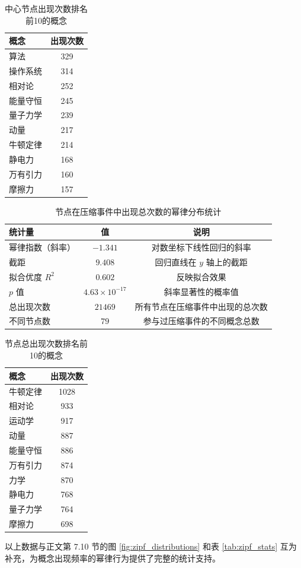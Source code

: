 \documentclass[12pt,a4paper]{article}
\begin{document}
\begin{table}[H]
\centering
\caption{中心节点出现次数排名前10的概念}
\label{tab:app_zipf_center_top10}
\begin{tabular}{lc}
\toprule
\textbf{概念} & \textbf{出现次数} \\
\midrule
算法      & 329 \\
操作系统  & 314 \\
相对论    & 252 \\
能量守恒  & 245 \\
量子力学  & 239 \\
动量      & 217 \\
牛顿定律  & 214 \\
静电力    & 168 \\
万有引力  & 160 \\
摩擦力    & 157 \\
\bottomrule
\end{tabular}
\end{table}

\begin{table}[H]
\centering
\caption{节点在压缩事件中出现总次数的幂律分布统计}
\label{tab:app_zipf_total}
\begin{tabular}{lcc}
\toprule
\textbf{统计量} & \textbf{值} & \textbf{说明} \\
\midrule
幂律指数（斜率） & $-1.341$ & 对数坐标下线性回归的斜率 \\
截距 & $9.408$ & 回归直线在 $y$ 轴上的截距 \\
拟合优度 $R^2$ & $0.602$ & 反映拟合效果 \\
$p$ 值 & $4.63\times10^{-17}$ & 斜率显著性的概率值 \\
总出现次数 & $21469$ & 所有节点在压缩事件中出现的总次数 \\
不同节点数 & $79$ & 参与过压缩事件的不同概念总数 \\
\bottomrule
\end{tabular}
\end{table}

\begin{table}[H]
\centering
\caption{节点总出现次数排名前10的概念}
\label{tab:app_zipf_total_top10}
\begin{tabular}{lc}
\toprule
\textbf{概念} & \textbf{出现次数} \\
\midrule
牛顿定律   & 1028 \\
相对论     & 933  \\
运动学     & 917  \\
动量       & 887  \\
能量守恒   & 886  \\
万有引力   & 874  \\
力学       & 870  \\
静电力     & 768  \\
量子力学   & 764  \\
摩擦力     & 698  \\
\bottomrule
\end{tabular}
\end{table}

以上数据与正文第 7.10 节的图 \ref{fig:zipf_distributions} 和表 \ref{tab:zipf_stats} 互为补充，为概念出现频率的幂律行为提供了完整的统计支持。
\end{document}
